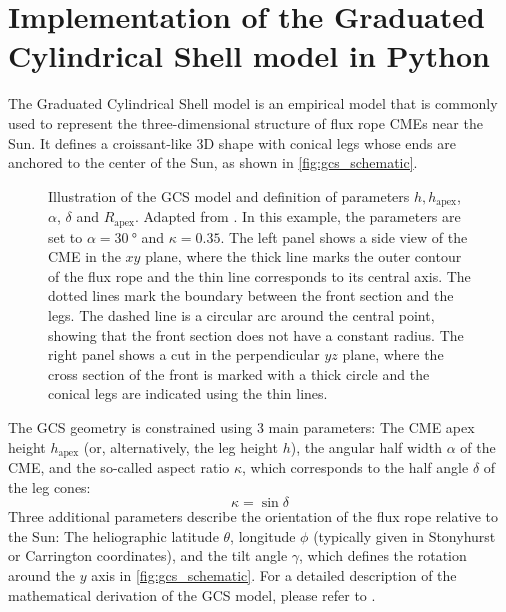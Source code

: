 \chapter{Implementation of the Graduated Cylindrical Shell model in Python}
\label{chp:GCS_Python}

The Graduated Cylindrical Shell model \citep[GCS,][]{Thernisien-2006-GCS,Thernisien-2011-GCS} is an empirical model that is commonly used to represent the three-dimensional structure of flux rope CMEs near the Sun. It defines a croissant-like 3D shape with conical legs whose ends are anchored to the center of the Sun, as shown in \autoref{fig:gcs_schematic}.

\begin{figure}
    
    \caption[Illustration of the GCS model]{Illustration of the GCS model and definition of parameters $h, h_\text{apex}$, $\alpha$, $\delta$ and $R_\text{apex}$. Adapted from \citet{Thernisien-2011-GCS}. In this example, the parameters are set to $\alpha = \SI{30}{\degree}$ and $\kappa = 0.35$. The left panel shows a side view of the CME in the $xy$ plane, where the thick line marks the outer contour of the flux rope and the thin line corresponds to its central axis. The dotted lines mark the boundary between the front section and the legs. The dashed line is a circular arc around the central point, showing that the front section does not have a constant radius. The right panel shows a cut in the perpendicular $yz$ plane, where the cross section of the front is marked with a thick circle and the conical legs are indicated using the thin lines.}
    \label{fig:gcs_schematic}
\end{figure}

The GCS geometry is constrained using 3 main parameters: The CME apex height $h_\text{apex}$ (or, alternatively, the leg height $h$), the angular half width $\alpha$ of the CME, and the so-called aspect ratio $\kappa$, which corresponds to the half angle $\delta$ of the leg cones:
\begin{equation}
    \kappa = \sin \delta
\end{equation}
Three additional parameters describe the orientation of the flux rope relative to the Sun: The heliographic latitude $\theta$, longitude $\phi$ (typically given in Stonyhurst or Carrington coordinates), and the tilt angle $\gamma$, which defines the rotation around the $y$ axis in \autoref{fig:gcs_schematic}. For a detailed description of the mathematical derivation of the GCS model, please refer to \citet{Thernisien-2011-GCS}.

